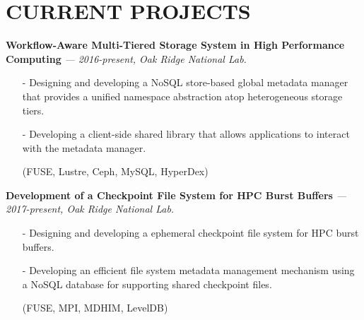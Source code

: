 \section{CURRENT PROJECTS}
\vspace{.03in}
  {\bf Workflow-Aware Multi-Tiered Storage System in High Performance Computing}
   {\it \footnotesize --- 2016-present, Oak Ridge National Lab.}
   \begin{itemize}[leftmargin=*]
    \setlength\itemsep{-0.02in}
    \item[-] Designing and developing a NoSQL store-based global metadata manager
	     that provides a unified namespace abstraction atop heterogeneous
	     storage tiers.
    \item[-] Developing a client-side shared library that allows applications to interact
             with the metadata manager.
    \item[] {\small(FUSE, Lustre, Ceph, MySQL, HyperDex)}
   \end{itemize}
  \vspace{-0.15in}
  {\bf Development of a Checkpoint File System for HPC Burst Buffers}
   {\it \footnotesize --- 2017-present, Oak Ridge National Lab.}
   \begin{itemize}[leftmargin=*]
    \setlength\itemsep{-0.02in}
    \item[-] Designing and developing a ephemeral checkpoint file system for HPC burst buffers.
    \item[-] Developing an efficient file system metadata management mechanism
             using a NoSQL database for supporting shared checkpoint files.
    \item[] {\small(FUSE, MPI, MDHIM, LevelDB)}
   \end{itemize}
